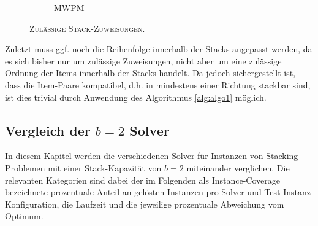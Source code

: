 \begin{figure}[H]
\begin{subfigure}[b]{0.45\textwidth}
  \caption{\textsc{MWPM}}
  \label{fig:mwpm_b=2}
\end{subfigure}
\caption{}
\end{figure}

\begin{figure}[H]
  \centering
    \caption{\textsc{Zulässige Stack-Zuweisungen.}}
    \label{fig:stacking_solution}
\end{figure}

Zuletzt muss ggf. noch die Reihenfolge innerhalb der Stacks angepasst werden, da es sich bisher nur um zulässige Zuweisungen,
nicht aber um eine zulässige Ordnung der Items innerhalb der Stacks handelt.
Da jedoch sichergestellt ist, dass die Item-Paare kompatibel, d.h. in mindestens einer Richtung stackbar sind,
ist dies trivial durch Anwendung des Algorithmus \ref{alg:algo1} möglich.

\subsection{Vergleich der $b = 2$ Solver}
\label{sec:solver_comp_b=2}

In diesem Kapitel werden die verschiedenen Solver für Instanzen von Stacking-Problemen mit einer Stack-Kapazität von $b=2$ miteinander verglichen.
Die relevanten Kategorien sind dabei der im Folgenden als Instance-Coverage bezeichnete prozentuale Anteil an gelösten Instanzen pro Solver
und Test-Instanz-Konfiguration, die Laufzeit und die jeweilige prozentuale Abweichung vom Optimum.

